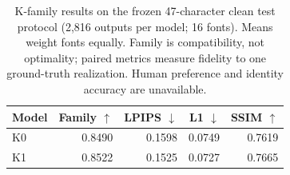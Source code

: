 \begin{table}[t]
\centering\small
\caption{K-family results on the frozen 47-character clean test protocol (2,816 outputs per model; 16 fonts). Means weight fonts equally. Family is compatibility, not optimality; paired metrics measure fidelity to one ground-truth realization. Human preference and identity accuracy are unavailable.}
\begin{tabular}{lrrrr}
\toprule
Model & Family $\uparrow$ & LPIPS $\downarrow$ & L1 $\downarrow$ & SSIM $\uparrow$ \\
\midrule
K0 & 0.8490 & 0.1598 & 0.0749 & 0.7619 \\
K1 & 0.8522 & 0.1525 & 0.0727 & 0.7665 \\
\bottomrule
\end{tabular}
\end{table}
